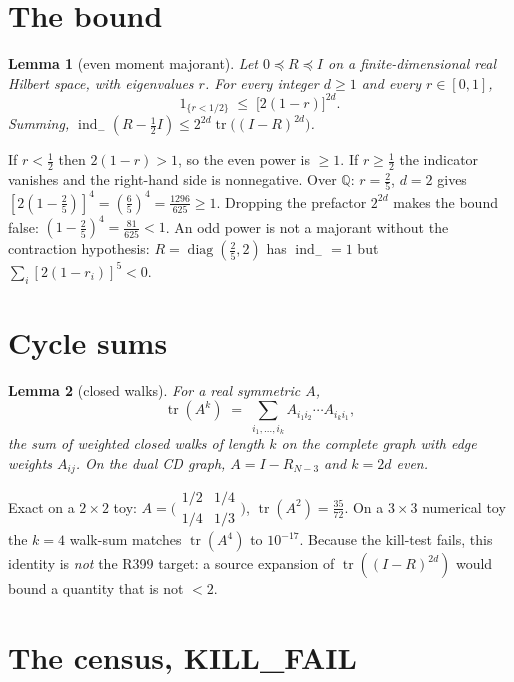 \documentclass[11pt]{article}
\newtheorem{lemma}{Lemma}
\theoremstyle{remark}
\newcommand{\indm}{\operatorname{ind}_{-}}
\newcommand{\half}{\tfrac12}
\newcommand{\tr}{\operatorname{tr}}
\begin{document}
\section{The bound}\label{sec:bound}

\begin{lemma}[even moment majorant]\label{lem:bound}
Let $0\preceq R\preceq I$ on a finite-dimensional real Hilbert
space, with eigenvalues $r$.
For every integer $d\ge 1$ and every $r\in[0,1]$,
\[
1_{\{r<1/2\}}
\;\le\;
\bigl[2(1-r)\bigr]^{2d}.
\]
Summing,
$\indm(R-\half I)\le 2^{2d}\tr\bigl((I-R)^{2d}\bigr)$.
\end{lemma}

If $r<\half$ then $2(1-r)>1$, so the even power is $\ge 1$.
If $r\ge\half$ the indicator vanishes and the right-hand side
is nonnegative.
Over $\mathbb{Q}$: $r=\tfrac25$, $d=2$ gives
$[2(1-\tfrac25)]^{4}=(\tfrac65)^{4}=\tfrac{1296}{625}\ge 1$.
Dropping the prefactor $2^{2d}$ makes the bound false:
$(1-\tfrac25)^{4}=\tfrac{81}{625}<1$.
An odd power is not a majorant without the contraction
hypothesis: $R=\operatorname{diag}(\tfrac25,2)$ has
$\indm=1$ but
$\sum_i[2(1-r_i)]^{5}<0$.

\section{Cycle sums}\label{sec:cycle}

\begin{lemma}[closed walks]\label{lem:cycle}
For a real symmetric $A$,
\[
\tr(A^{k})
\;=\;
\sum_{i_1,\ldots,i_k}
A_{i_1 i_2}\cdots A_{i_k i_1},
\]
the sum of weighted closed walks of length $k$ on the
complete graph with edge weights $A_{ij}$.
On the dual CD graph, $A=I-R_{N-3}$ and $k=2d$ even.
\end{lemma}

Exact on a $2\times 2$ toy: $A=\bigl(\begin{smallmatrix}1/2&1/4\\1/4&1/3\end{smallmatrix}\bigr)$,
$\tr(A^{2})=\tfrac{35}{72}$.
On a $3\times 3$ numerical toy the $k=4$ walk-sum matches
$\tr(A^{4})$ to $10^{-17}$.
Because the kill-test fails, this identity is \emph{not} the
R399 target: a source expansion of $\tr((I-R)^{2d})$ would
bound a quantity that is not $<2$.

\section{The census, KILL\_FAIL}\label{sec:census}
\end{document}
